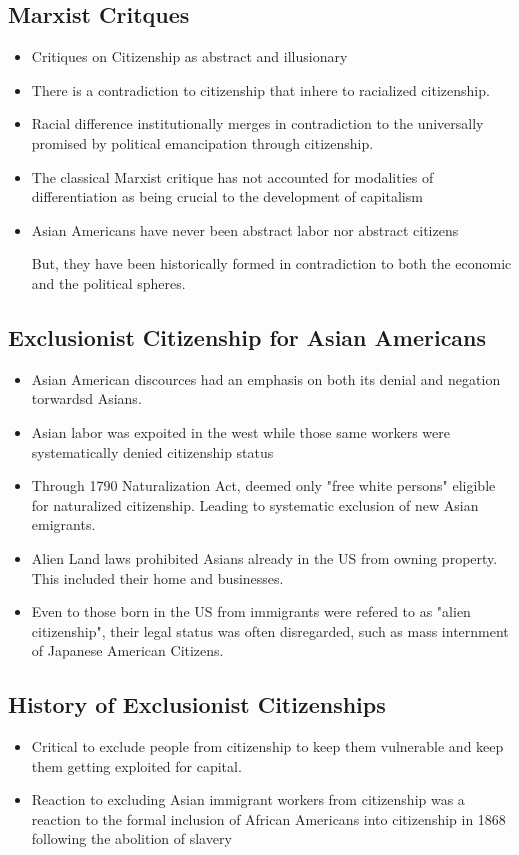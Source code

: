 \documentclass{article}
\begin{document}
\subsection{Marxist Critques}
\begin{itemize}
  \item Critiques on Citizenship as abstract and illusionary
  \item There is a contradiction to citizenship
    that inhere to racialized citizenship.
  \item Racial difference institutionally merges in contradiction
    to the universally promised by political emancipation
    through citizenship.
  \item The classical Marxist critique has not accounted for modalities of
    differentiation as being crucial to the development of capitalism
  \item Asian Americans have never been abstract labor nor abstract citizens

    But, they have been historically formed in contradiction
    to both the economic and the political spheres.
\end{itemize}

\subsection{Exclusionist Citizenship for Asian Americans}

\begin{itemize}
  \item Asian American discources had an emphasis on both
    its denial and negation torwardsd Asians.
  \item Asian labor was expoited in the west while those
    same workers were systematically denied citizenship status
  \item Through 1790 Naturalization Act, deemed only "free white persons"
    eligible for naturalized citizenship. Leading to 
    systematic exclusion of new Asian emigrants.
  \item Alien Land laws prohibited Asians already in the US
    from owning property. This included their home and businesses.
  \item Even to those born in the US from immigrants were refered to as
    "alien citizenship", their legal status was often disregarded,
    such as mass internment of Japanese American Citizens.
\end{itemize}

\subsection{History of Exclusionist Citizenships}
\begin{itemize}
  \item Critical to exclude people from citizenship to keep them
    vulnerable and keep them getting exploited for capital.
  \item Reaction to excluding Asian immigrant workers from citizenship
    was a reaction to the formal inclusion of African Americans
    into citizenship in 1868 following the abolition of slavery
\end{itemize}
\end{document}
